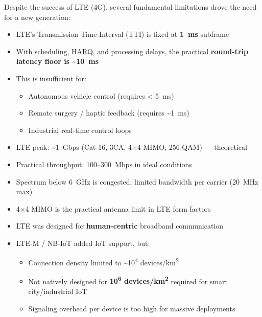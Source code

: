 
Despite the success of LTE (4G), several fundamental limitations drove the need for a new generation:


\begin{itemize}
\tightlist
\item
  LTE’s Transmission Time Interval (TTI) is fixed at \textbf{1~ms} subframe
\item
  With scheduling, HARQ, and processing delays, the practical \textbf{round-trip latency floor is \textasciitilde{}10~ms}
\item
  This is insufficient for:

  \begin{itemize}
  \tightlist
  \item
    Autonomous vehicle control (requires \textless{} 5~ms)
  \item
    Remote surgery /\allowbreak{} haptic feedback (requires \textasciitilde{}1~ms)
  \item
    Industrial real-time control loops
  \end{itemize}
\end{itemize}


\begin{itemize}
\tightlist
\item
  LTE peak: \textasciitilde{}1~Gbps (Cat-16, 3CA, 4\ensuremath{\times}4 MIMO, 256-QAM) — theoretical
\item
  Practical throughput: 100–300~Mbps in ideal conditions
\item
  Spectrum below 6~GHz is congested; limited bandwidth per carrier (20~MHz max)
\item
  4\ensuremath{\times}4 MIMO is the practical antenna limit in LTE form factors
\end{itemize}


\begin{itemize}
\tightlist
\item
  LTE was designed for \textbf{human-centric} broadband communication
\item
  LTE-M /\allowbreak{} NB-IoT added IoT support, but:

  \begin{itemize}
  \tightlist
  \item
    Connection density limited to \textasciitilde{}10\textsuperscript{4} devices/\allowbreak{}km\textsuperscript{2}
  \item
    Not natively designed for \textbf{10\textsuperscript{6} devices/\allowbreak{}km\textsuperscript{2}} required for smart city/\allowbreak{}industrial IoT
  \item
    Signaling overhead per device is too high for massive deployments
  \end{itemize}
\end{itemize}

